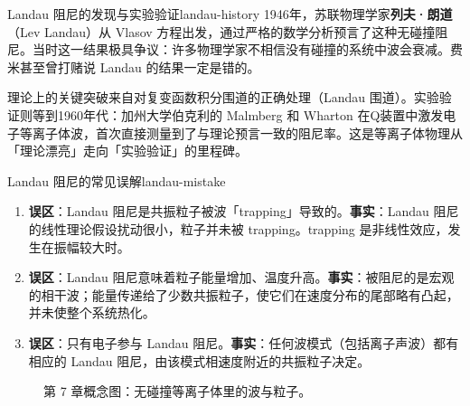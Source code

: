 \documentclass[12pt,a4paper,openany,oneside]{book}
\begin{document}
\begin{history}{Landau 阻尼的发现与实验验证}{landau-history}
1946年，苏联物理学家\textbf{列夫·朗道}（Lev Landau）从 Vlasov 方程出发，通过严格的数学分析预言了这种无碰撞阻尼。当时这一结果极具争议：许多物理学家不相信没有碰撞的系统中波会衰减。费米甚至曾打赌说 Landau 的结果一定是错的。

理论上的关键突破来自对复变函数积分围道的正确处理（Landau 围道）。实验验证则等到1960年代：加州大学伯克利的 Malmberg 和 Wharton 在Q装置中激发电子等离子体波，首次直接测量到了与理论预言一致的阻尼率。这是等离子体物理从「理论漂亮」走向「实验验证」的里程碑。
\end{history}

\begin{warning}{Landau 阻尼的常见误解}{landau-mistake}
\begin{enumerate}
\item \textbf{误区}：Landau 阻尼是共振粒子被波「trapping」导致的。\textbf{事实}：Landau 阻尼的线性理论假设扰动很小，粒子并未被 trapping。trapping 是非线性效应，发生在振幅较大时。
\item \textbf{误区}：Landau 阻尼意味着粒子能量增加、温度升高。\textbf{事实}：被阻尼的是宏观的相干波；能量传递给了少数共振粒子，使它们在速度分布的尾部略有凸起，并未使整个系统热化。
\item \textbf{误区}：只有电子参与 Landau 阻尼。\textbf{事实}：任何波模式（包括离子声波）都有相应的 Landau 阻尼，由该模式相速度附近的共振粒子决定。
\end{enumerate}
\end{warning}

\begin{figure}[htbp]
\centering
{}
\caption{第 7 章概念图：无碰撞等离子体里的波与粒子。}
\label{fig:cm-ch7}
\end{figure}
\end{document}
